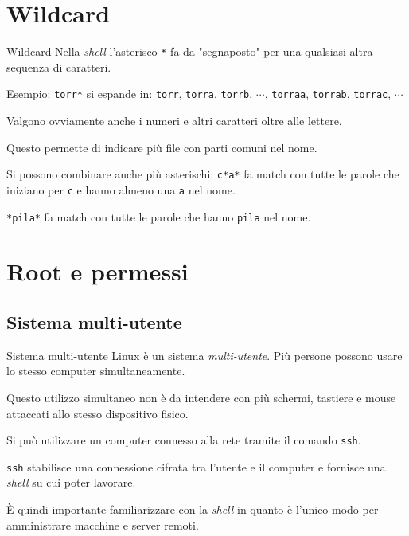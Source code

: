 \documentclass{beamer}
\begin{document}
\section{Wildcard}
\begin{frame}{Wildcard}
  Nella \textit{shell} l'asterisco \texttt{*} fa da "segnaposto" per una 
  qualsiasi altra sequenza di caratteri.\bigskip

  Esempio: \texttt{torr*} si espande in: \texttt{torr}, \texttt{torra}, 
  \texttt{torrb}, $\cdots$, \texttt{torraa}, \texttt{torrab}, \texttt{torrac}, 
  $\cdots$\bigskip

  Valgono ovviamente anche i numeri e altri caratteri oltre alle lettere.\bigskip

  Questo permette di indicare più file con parti comuni nel nome.\bigskip

  Si possono combinare anche più asterischi: \texttt{c*a*} fa match con tutte le
  parole che iniziano per \texttt{c} e hanno almeno una \texttt{a} nel 
  nome.\bigskip

  \texttt{*pila*} fa match con tutte le parole che hanno \texttt{pila} nel 
  nome.\bigskip

\end{frame}

\section{Root e permessi}

\subsection{Sistema multi-utente}
\begin{frame}{Sistema multi-utente}
  Linux è un sistema \textit{multi-utente}. Più persone possono usare lo stesso
  computer simultaneamente.\bigskip

  Questo utilizzo simultaneo non è da intendere con più schermi, tastiere e mouse
  attaccati allo stesso dispositivo fisico.\bigskip

  Si può utilizzare un computer connesso alla rete tramite il comando 
  \texttt{ssh}.\bigskip

  \texttt{ssh} stabilisce una connessione cifrata tra l'utente e il computer e
  fornisce una \textit{shell} su cui poter lavorare.\bigskip

  È quindi importante familiarizzare con la \textit{shell} in quanto è l'unico
  modo per amministrare macchine e server remoti.
\end{frame}
\end{document}

